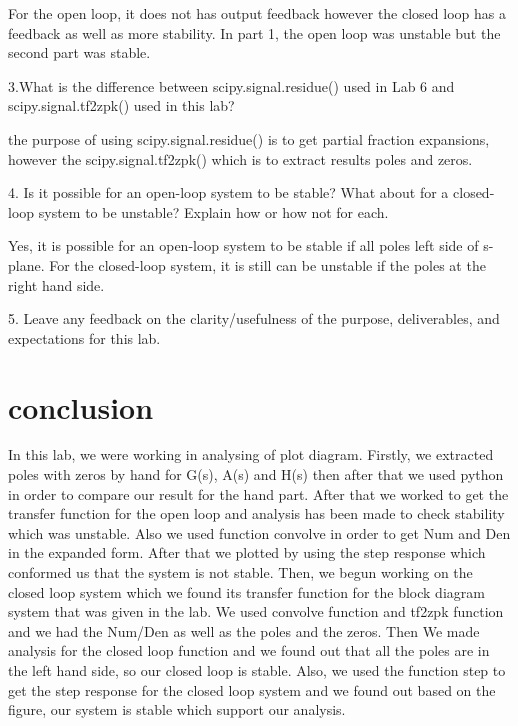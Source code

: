 \documentclass[12pt]{report}
\begin{document}
For the open loop, it does not has output feedback however the closed loop has a feedback as well as more stability. In part 1, the open loop was unstable but the second part was stable.  

3.What is the difference between scipy.signal.residue() used in Lab 6 and
scipy.signal.tf2zpk() used in this lab?

the purpose of using scipy.signal.residue() is to get partial fraction expansions, however the scipy.signal.tf2zpk() which is to extract results  poles and zeros.

4. Is it possible for an open-loop system to be stable? What about for a closed-loop system to
be unstable? Explain how or how not for each.

Yes, it is possible for an open-loop system to be stable if all poles left side of s-plane. For the closed-loop system, it is still can be unstable if the poles at the right hand side.

5. Leave any feedback on the clarity/usefulness of the purpose, deliverables, and expectations
for this lab.





\section{conclusion}

In this lab, we were working in analysing of plot diagram. Firstly, we extracted poles with zeros by hand  for G(s), A(s) and H(s) then after that we used python in order to compare our result for the hand part. After that we worked to get the transfer function for the open loop and analysis has been made to check stability which was unstable. Also we used function convolve in order to get Num and Den in the expanded form. After that we plotted by using the step response which conformed us that the system is not stable. 
Then, we begun working on the closed loop system which we found its transfer function for the block diagram system that was given in the lab.
We used convolve function and tf2zpk function and we had the Num/Den as well as the poles and the zeros. Then We made analysis for the closed loop function and we found out that all the poles are in the left hand side, so our closed loop is stable. Also, we used the function step to get the step response for the closed loop system and we found out based on the figure, our system is stable which support our analysis. 

\newpage
\end{document}
